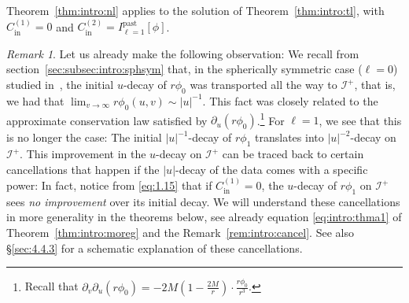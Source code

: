 \documentclass[11pt,english]{article}
\numberwithin{equation}{section}
\theoremstyle{remark}
\newtheorem{rem}{Remark}[section]
\theoremstyle{plain}
\theoremstyle{remark}
\newcommand{\pu}{\partial_u}
\newcommand{\pv}{\partial_v}
\renewcommand{\(}{\left(}
\renewcommand{\)}{\right)}
\newcommand{\cc}{C_{\mathrm{in}}^{(1)}}
\newcommand{\ccc}{C_{\mathrm{in}}^{(2)}}
\newcommand{\ILpn}[1]{I_{\ell=#1}^{\mathrm{past}}}
\begin{document}
Theorem~\ref{thm:intro:nl} applies to the solution of Theorem~\ref{thm:intro:tl}, with $\cc=0$ and $\ccc=\ILpn1[\phi]$.
\begin{rem}
Let us already make the following observation: We recall from section~\ref{sec:subsec:intro:sphsym} that, in the spherically symmetric case ($\ell=0$) studied in~\cite{I}, the initial $u$-decay of $r\phi_0$ was transported all the way to $\mathcal{I}^+$, that is, we had that $\lim_{v\to\infty}r\phi_0(u,v)\sim|u|^{-1}$.
 This fact was closely related to the approximate conservation law satisfied by $\pu(r\phi_0)$.\footnote{Recall that $\pv\pu(r\phi_0)= -2M(1-\frac{2M}{r})\cdot\frac{r\phi_0}{r^3}$.} For $\ell=1$, we see that this is no longer the case: The initial $|u|^{-1}$-decay of $r\phi_1$ translates into $|u|^{-2}$-decay on $\mathcal{I}^+$. 
  This improvement in the $u$-decay on $\mathcal I^+$ can be traced back to certain cancellations that happen if the $|u|$-decay of the data comes with a specific power: 
  In fact, notice from \eqref{eq:1.15} that if $C_{\mathrm{in}}^{(1)}=0$, the $u$-decay of $r\phi_1$ on $\mathcal I^+$ sees \textit{no improvement} over its initial decay.
We will understand these cancellations in more generality in the theorems below, see already equation \eqref{eq:intro:thma1} of Theorem~\ref{thm:intro:moreg} and the Remark~\ref{rem:intro:cancel}.
See also \S\ref{sec:4.4.3} for a schematic explanation of these cancellations.
\end{rem}
\end{document}
